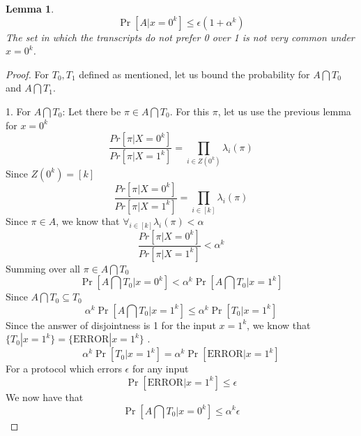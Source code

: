 \documentclass{article}
\theoremstyle{plain}
\newtheorem{lemma}[theorem]{Lemma}
\begin{document}
\begin{lemma}
    \begin{equation*}
        \Pr[A| x = 0^k] \leq \epsilon (1 + \alpha ^k)
    \end{equation*}
    The set in which the transcripts do not prefer 0 over 1 is not very common under $x = 0^k$.
\end{lemma}
\begin{proof}
For $T_0, T_1$ defined as mentioned, let us bound the probability for $A \bigcap T_0$ and $A \bigcap T_1$. \newline

1. For $A \bigcap T_0$: \newline
Let there be $\pi \in A \bigcap T_0$. \newline
For this $\pi$, let us use the previous lemma for $x = 0^k$
\begin{equation*}
    \frac{Pr[\pi | X = 0^k]}{Pr[\pi | X = 1^k]} = \prod_{i \in Z(0^k)} \lambda_i(\pi)
\end{equation*}
Since $Z(0^k) = [k]$
\begin{equation*}
    \frac{Pr[\pi | X = 0^k]}{Pr[\pi | X = 1^k]} = \prod_{i \in [k]} \lambda_i(\pi)
\end{equation*}
Since $\pi \in A$, we know that $\forall_{i \in [k]}\lambda_i(\pi) < \alpha$
\begin{equation*}
    \frac{Pr[\pi | X = 0^k]}{Pr[\pi | X = 1^k]} < \alpha^{k}
\end{equation*}
Summing over all $\pi \in A \bigcap T_0 $
\begin{equation*}
    \Pr[A \bigcap T_0 | x = 0^k] < \alpha ^k \Pr[A \bigcap T_0 | x = 1^k]
\end{equation*}
Since $A \bigcap T_0 \subseteq T_0$
\begin{equation*}
    \alpha ^k \Pr[A \bigcap T_0 | x = 1^k] \leq \alpha ^k \Pr[T_0 | x = 1^k]
\end{equation*}
Since the answer of disjointness is 1 for the input $x=1^k$, we know that $\{T_0 | x=1^k\} = \{\text{ERROR} | x=1^k\}$ .
\begin{equation*}
    \alpha ^k \Pr[T_0 | x = 1^k] = \alpha ^k \Pr[\text{ERROR} | x = 1^k]
\end{equation*}
For a protocol which errors $\epsilon$ for any input
\begin{equation*}
    \Pr[\text{ERROR} | x = 1^k] \leq \epsilon
\end{equation*}
We now have that 
\begin{equation*}
    \Pr[A \bigcap T_0 | x = 0^k] \leq \alpha^k \epsilon

\end{equation*}
\end{proof}
\end{document}
